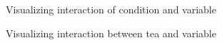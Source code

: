 \documentclass{article}
\begin{document}
\begin{figure}[H]
  \caption{Visualizing interaction of condition and variable}
  \noindent{}
  \centering
\end{figure}

\begin{figure}[H]
  \caption{Visualizing interaction between tea and variable}
  \noindent{}
  \centering
\end{figure}
\end{document}
